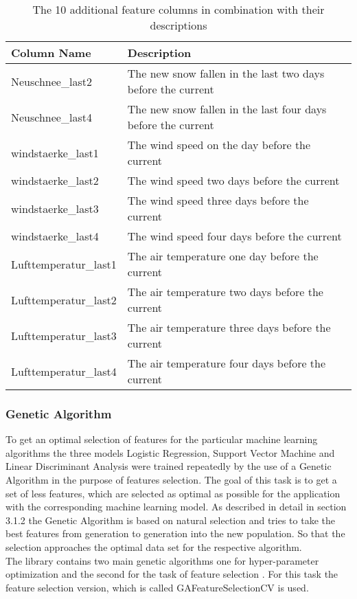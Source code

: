 \documentclass[../masterarbeit.tex]{subfiles}
\begin{document}
\begin{table}
    \centering
    \begin{tabular}{|l|l|}
    \hline
    	Column Name & Description \\ \hline
        Neuschnee\_last2 & The new snow fallen in the last two days before the current \\ \hline
        Neuschnee\_last4 & The new snow fallen in the last four days before the current \\ \hline
        windstaerke\_last1 & The wind speed on the day before the current \\ \hline
        windstaerke\_last2 & The wind speed two days before the current \\ \hline
        windstaerke\_last3 & The wind speed three days before the current \\ \hline
        windstaerke\_last4 & The wind speed four days before the current \\ \hline
        Lufttemperatur\_last1 & The air temperature one day before the current \\ \hline
        Lufttemperatur\_last2 & The air temperature two days before the current \\ \hline
        Lufttemperatur\_last3 & The air temperature three days before the current \\ \hline
        Lufttemperatur\_last4 & The air temperature four days before the current \\ \hline
    \end{tabular}
    \caption{The 10 additional feature columns in combination with their descriptions}
\end{table}









\subsubsection{Genetic Algorithm}

To get an optimal selection of features for the particular machine learning algorithms the three models Logistic Regression, Support Vector Machine and Linear Discriminant Analysis were trained repeatedly by the use of a Genetic Algorithm in the purpose of features selection. The goal of this task is to get a set of less features, which are selected as optimal as possible for the application with the corresponding machine learning model. As described in detail in section 3.1.2 the Genetic Algorithm is based on natural selection and tries to take the best features from generation to generation into the new population. So that the selection approaches the optimal data set for the respective algorithm. \\
The library contains two main genetic algorithms one for hyper-parameter optimization and the second for the task of feature selection \textcite[]{Sklearn_genetic_feature_docu:2022}. For this task the feature selection version, which is called GAFeatureSelectionCV is used.
\end{document}
